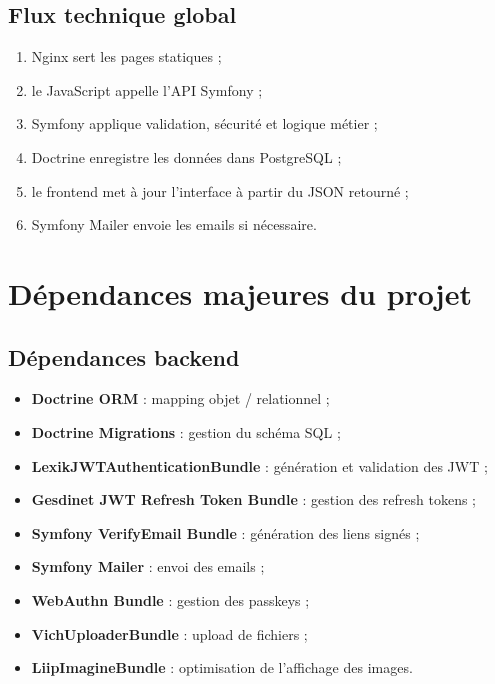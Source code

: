 \documentclass[12pt,a4paper]{report}
\begin{document}
\section{Flux technique global}

\begin{enumerate}[leftmargin=1.2cm]
    \item Nginx sert les pages statiques ;
    \item le JavaScript appelle l'API Symfony ;
    \item Symfony applique validation, sécurité et logique métier ;
    \item Doctrine enregistre les données dans PostgreSQL ;
    \item le frontend met à jour l'interface à partir du JSON retourné ;
    \item Symfony Mailer envoie les emails si nécessaire.
\end{enumerate}

\chapter{Dépendances majeures du projet}

\section{Dépendances backend}

\begin{itemize}[leftmargin=1.2cm]
    \item \textbf{Doctrine ORM} : mapping objet / relationnel ;
    \item \textbf{Doctrine Migrations} : gestion du schéma SQL ;
    \item \textbf{LexikJWTAuthenticationBundle} : génération et validation des JWT ;
    \item \textbf{Gesdinet JWT Refresh Token Bundle} : gestion des refresh tokens ;
    \item \textbf{Symfony VerifyEmail Bundle} : génération des liens signés ;
    \item \textbf{Symfony Mailer} : envoi des emails ;
    \item \textbf{WebAuthn Bundle} : gestion des passkeys ;
    \item \textbf{VichUploaderBundle} : upload de fichiers ;
    \item \textbf{LiipImagineBundle} : optimisation de l'affichage des images.
\end{itemize}
\end{document}
